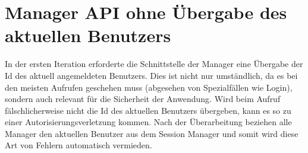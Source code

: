 \documentclass[12pt,DIV14,BCOR10mm,a4paper,parskip=half-,headsepline,headinclude,english,ngerman,bibliography=totocnumbered]{scrreprt}
\begin{document}
\section{Manager API ohne Übergabe des aktuellen Benutzers}
In der ersten Iteration erforderte die Schnittstelle der Manager eine Übergabe der Id des aktuell angemeldeten Benutzers. Dies ist nicht nur umständlich, da es bei den meisten Aufrufen geschehen muss (abgesehen von Spezialfällen wie Login), sondern auch relevant für die Sicherheit der Anwendung. Wird beim Aufruf fälschlicherweise nicht die Id des aktuellen Benutzers übergeben, kann es so zu einer Autorisierungsverletzung kommen. Nach der Überarbeitung beziehen alle Manager den aktuellen Benutzer aus dem Session Manager und somit wird diese Art von Fehlern automatisch vermieden.

\printbibliography

\printacronyms[title=Abkürzungsverzeichnis,toctitle=Abkürzungsverzeichnis]
\printglossary[title=Glossar,toctitle=Glossar,type=main]

\iftotalfigures
  \listoffigures
\fi

\end{document}
